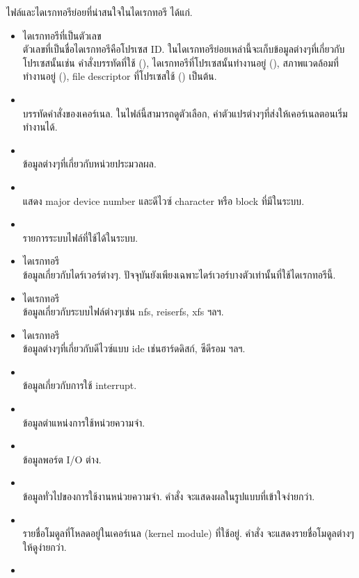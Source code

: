 \begin{thwbr}
ไฟล์และไดเรกทอรีย่อยที่น่าสนใจในไดเรกทอรี  ได้แก่.
\begin{itemize}
\item ไดเรกทอรีที่เป็นตัวเลข\\
ตัวเลขที่เป็นชื่อไดเรกทอรีคือโปรเซส ID. ในไดเรกทอรีย่อยเหล่านี้จะเก็บข้อมูลต่างๆที่เกี่ยวกับโปรเซสนั้นเช่น คำสั่งบรรทัดที่ใช้ (), ไดเรกทอรีที่โปรเซสนั้นทำงานอยู่ (), สภาพแวดล้อมที่ทำงานอยู่ (), file descriptor ที่โปรเซสใช้ () เป็นต้น.
\item {}\\
บรรทัดคำสั่งของเคอร์เนล. ในไฟล์นี้สามารถดูตัวเลือก, ค่าตัวแปรต่างๆที่ส่งให้เคอร์เนลตอนเริ่มทำงานได้.
\item {}\\
ข้อมูลต่างๆที่เกี่ยวกับหน่วยประมวลผล.
\item {}\\
แสดง major device number และดีไวซ์ character หรือ block ที่มีในระบบ.
\item {}\\
รายการระบบไฟล์ที่ใช้ได้ในระบบ.
\item ไดเรกทอรี \\
ข้อมูลเกี่ยวกับไดร์เวอร์ต่างๆ. ปัจจุบันยังเพียงเฉพาะไดร์เวอร์บางตัวเท่านั้นที่ใช้ไดเรกทอรีนี้.
\item ไดเรกทอรี \\
ข้อมูลเกี่ยวกับระบบไฟล์ต่างๆเช่น nfs, reiserfs, xfs ฯลฯ. 
\item ไดเรกทอรี \\
ข้อมูลต่างๆที่เกี่ยวกับดีไวซ์แบบ ide เช่นฮาร์ดดิสก์, ซีดีรอม ฯลฯ.
\item {}\\
ข้อมูลเกี่ยวกับการใช้ interrupt.
\item {}\\
ข้อมูลตำแหน่งการใช้หน่วยความจำ.
\item {}\\
ข้อมูลพอร์ต I/O ต่าง.
\item {}\\
ข้อมูลทั่วไปของการใช้งานหน่วยความจำ. คำสั่ง  จะแสดงผลในรูปแบบที่เข้าใจง่ายกว่า.
\item {}\\
รายชื่อโมดูลที่โหลดอยู่ในเคอร์เนล (kernel module) ที่ใช้อยู่. คำสั่ง  จะแสดงรายชื่อโมดูลต่างๆให้ดูง่ายกว่า.
\item {}\\

\end{itemize}
\end{thwbr}

